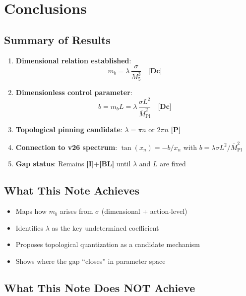 \documentclass[11pt,a4paper]{article}
\newcommand{\Mpl}{\bar{M}_{\mathrm{Pl}}}
\newcommand{\Mfive}{M_5}
\newcommand{\mb}{m_b}
\newcommand{\tagDc}{\textbf{[Dc]}}
\newcommand{\tagI}{\textbf{[I]}}
\newcommand{\tagBL}{\textbf{[BL]}}
\newcommand{\tagP}{\textbf{[P]}}
\theoremstyle{definition}
\theoremstyle{plain}
\theoremstyle{remark}
\begin{document}
\section{Conclusions}
\label{sec:conclusions}

\subsection{Summary of Results}

\begin{enumerate}
\item \textbf{Dimensional relation established}:
\begin{equation}
\mb = \lambda \, \frac{\sigma}{\Mfive^3} \quad \tagDc{}
\label{eq:conc-mb}
\end{equation}

\item \textbf{Dimensionless control parameter}:
\begin{equation}
b = \mb L = \lambda \, \frac{\sigma L^2}{\Mpl^2} \quad \tagDc{}
\label{eq:conc-b}
\end{equation}

\item \textbf{Topological pinning candidate}: $\lambda = \pi n$ or $2\pi n$ \tagP{}

\item \textbf{Connection to v26 spectrum}: $\tan(x_n) = -b/x_n$ with
$b = \lambda\sigma L^2/\Mpl^2$

\item \textbf{Gap status}: Remains \tagI{}+\tagBL{} until $\lambda$ and $L$ are fixed
\end{enumerate}

\subsection{What This Note Achieves}

\begin{itemize}
\item Maps how $\mb$ arises from $\sigma$ (dimensional + action-level)
\item Identifies $\lambda$ as the key undetermined coefficient
\item Proposes topological quantization as a candidate mechanism
\item Shows where the gap ``closes'' in parameter space
\end{itemize}

\subsection{What This Note Does NOT Achieve}
\end{document}
